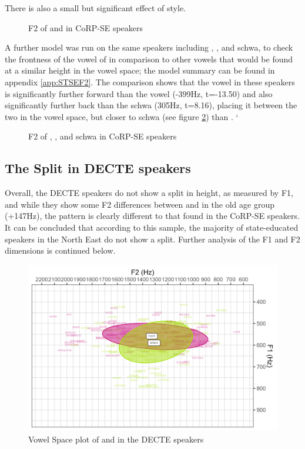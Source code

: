 \documentclass[../../../00.FullDoc/tex/APRReport-year4]{subfiles}
\begin{document}
There is also a small but significant effect of style.



\begin{figure}[h]
	
	\caption{F2 of \foot{} and \strutt{} in CoRP-SE speakers} \label{fig:FSF2SE}
\end{figure}

A further model was run on the same speakers including \strutt{}, , and schwa, to check the frontness of the \strutt{} vowel of in comparison to other vowels that would be found at a similar height in the vowel space; the model summary can be found in appendix \ref{app:STSEF2}. The comparison shows that the \strutt{} vowel in these speakers is significantly further forward than the  vowel (-399Hz, t=-13.50) and also significantly further back than the schwa (305Hz, t=8.16), placing it between the two in the vowel space, but closer to schwa (see figure \ref{fig:STF2SE}) than .
`
\begin{figure}[h]
	
	\caption{F2 of \strutt{}, , and schwa in CoRP-SE speakers} \label{fig:STF2SE}
\end{figure}



\subsection{The  Split in DECTE speakers}
Overall, the DECTE speakers do not show a split in height, as measured by F1, and while they show some F2 differences between \foot{} and \strutt{} in the old age group (+147Hz), the pattern is clearly different to that found in the CoRP-SE speakers. It can be concluded that according to this sample, the majority of state-educated speakers in the North East do not show a \FS{} split. Further analysis of the F1 and F2 dimensions is continued below.

\begin{figure}[h]
	\centering
	\includegraphics[width=\textwidth]{../figures/FS-DE-vplot.png}
	\caption{Vowel Space plot of \foot{} and \strutt{} in the DECTE speakers} \label{fig:FSvplotDE}
\end{figure}
\end{document}
